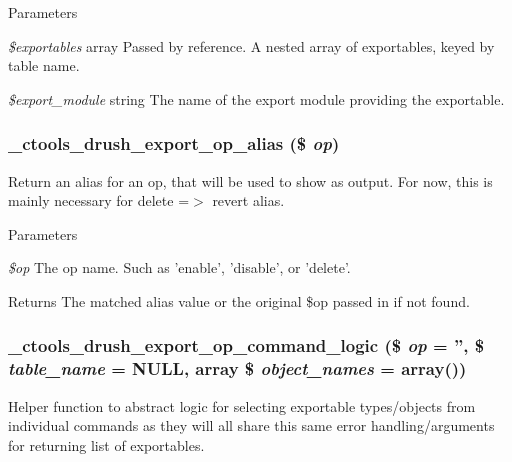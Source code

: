 \begin{DoxyParams}{Parameters}
\item[{\em \$exportables}]array Passed by reference. A nested array of exportables, keyed by table name. \item[{\em \$export\_\-module}]string The name of the export module providing the exportable. \end{DoxyParams}
\hypertarget{ctools_8drush_8inc_a58e51a8f723bd1f34b7b881d57b23726}{
\subsubsection[{\_\-ctools\_\-drush\_\-export\_\-op\_\-alias}]{\setlength{\rightskip}{0pt plus 5cm}\_\-ctools\_\-drush\_\-export\_\-op\_\-alias (\$ {\em op})}}
\label{ctools_8drush_8inc_a58e51a8f723bd1f34b7b881d57b23726}
Return an alias for an op, that will be used to show as output. For now, this is mainly necessary for delete =$>$ revert alias.


\begin{DoxyParams}{Parameters}
\item[{\em \$op}]The op name. Such as 'enable', 'disable', or 'delete'.\end{DoxyParams}
\begin{DoxyReturn}{Returns}
The matched alias value or the original \$op passed in if not found. 
\end{DoxyReturn}
\hypertarget{ctools_8drush_8inc_af5212f1cdc2b708efbd93619e2697aab}{
\subsubsection[{\_\-ctools\_\-drush\_\-export\_\-op\_\-command\_\-logic}]{\setlength{\rightskip}{0pt plus 5cm}\_\-ctools\_\-drush\_\-export\_\-op\_\-command\_\-logic (\$ {\em op} = {\ttfamily ''}, \/  \$ {\em table\_\-name} = {\ttfamily NULL}, \/  array \$ {\em object\_\-names} = {\ttfamily array()})}}
\label{ctools_8drush_8inc_af5212f1cdc2b708efbd93619e2697aab}
Helper function to abstract logic for selecting exportable types/objects from individual commands as they will all share this same error handling/arguments for returning list of exportables.


